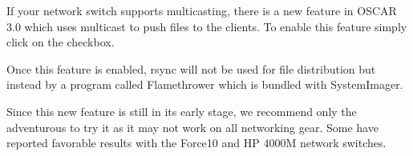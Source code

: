 \begchange
If your network switch supports multicasting, there is a new feature in
OSCAR 3.0 which uses multicast to push files to the clients.  To enable
this feature simply click on the  checkbox. 

Once this feature is enabled, rsync will not be used for file distribution
but instead by a program called Flamethrower which is bundled with
SystemImager.

Since this new feature is still in its early stage, we recommend only the
adventurous to try it as it may not work on all networking gear.  Some
have reported favorable results with the Force10 and HP 4000M network
switches.
\endchange



